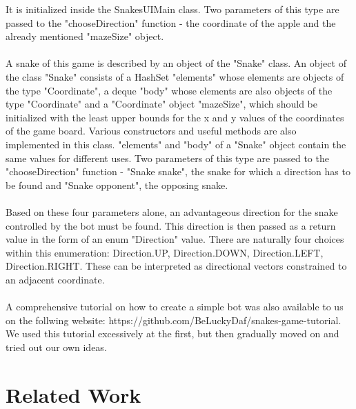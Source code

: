 \documentclass[a4paper,12pt]{article}
\begin{document}
It is initialized inside the SnakesUIMain class. Two parameters of this type are passed to 
the "chooseDirection" function - the coordinate of the apple and the already mentioned "mazeSize" object.\\
\\A snake of this game is described by an object of the "Snake" class. An object of the class "Snake"
consists of a HashSet "elements" whose elements are objects of the type "Coordinate", a deque "body"
whose elements are also objects of the type "Coordinate" and a "Coordinate" object "mazeSize", which 
should be initialized with the least upper bounds for the x and y values of the coordinates of the game
board. Various constructors and useful methods are also implemented in this class. "elements" and "body" 
of a "Snake" object contain the same values for different uses. Two parameters of this type are passed to 
the "chooseDirection" function - "Snake snake", the snake for which a direction has to be found and "Snake opponent", the opposing snake.\\
\\Based on these four parameters alone, an advantageous direction for the snake controlled by the bot 
must be found. This direction is then passed as a return value in the form of an enum "Direction" value. 
There are naturally four choices within this enumeration: Direction.UP, Direction.DOWN, Direction.LEFT,
Direction.RIGHT. These can be interpreted as directional vectors constrained to an adjacent coordinate.\\
\\A comprehensive tutorial on how to create a simple bot was also available to us on the follwing website: 
https://github.com/BeLuckyDaf/snakes-game-tutorial. We used this tutorial excessively at the first, but then 
gradually moved on and tried out our own ideas.

\section{Related Work}
\end{document}
